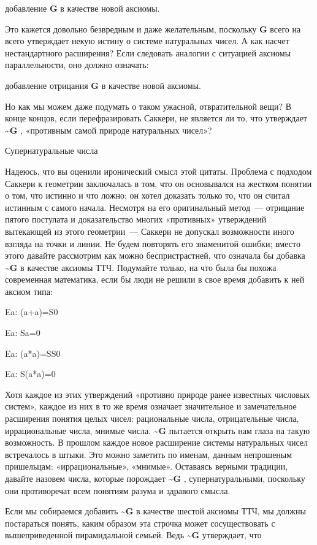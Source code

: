 \documentclass[../main.tex]{subfiles}
\begin{document}
добавление \textbf{G} в качестве новой аксиомы.

Это кажется довольно безвредным и даже желательным, поскольку \textbf{G} всего на всего утверждает некую истину о системе натуральных чисел. А как насчет нестандартного расширения? Если следовать аналогии с ситуацией аксиомы параллельности, оно должно означать:

добавление отрицания \textbf{G} в качестве новой аксиомы.

Но как мы можем даже подумать о таком ужасной, отвратительной вещи? В конце концов, если перефразировать Саккери, не является ли то, что утверждает \textbf{\textasciitilde G} , «противным самой природе натуральных чисел»?

Супернатуральные числа

Надеюсь, что вы оценили иронический смысл этой цитаты. Проблема с подходом Саккери к геометрии заключалась в том, что он основывался на жестком понятии о том, что истинно и что ложно; он хотел доказать только то, что он считал истинным с самого начала. Несмотря на его оригинальный метод~--- отрицание пятого постулата и доказательство многих «противных» утверждений вытекающей из этого геометрии~--- Саккери не допускал возможности иного взгляда на точки и линии. Не будем повторять его знаменитой ошибки; вместо этого давайте рассмотрим как можно беспристрастней, что означала бы добавка \textbf{\textasciitilde G} в качестве аксиомы ТТЧ. Подумайте только, на что была бы похожа современная математика, если бы люди не решили в свое время добавить к ней аксиом типа:

Ea: (a+a)=S0

Ea: Sa=0

Ea: (a*a)=SS0

Ea: S(a*a)=0

Хотя каждое из этих утверждений «противно природе ранее известных числовых систем», каждое из них в то же время означает значительное и замечательное расширения понятия целых чисел: рациональные числа, отрицательные числа, иррациональные числа, мнимые числа. \textbf{\textasciitilde G} пытается открыть нам глаза на такую возможность. В прошлом каждое новое расширение системы натуральных чисел встречалось в штыки. Это можно заметить по именам, данным непрошеным пришельцам: «иррациональные», «мнимые». Оставаясь верными традиции, давайте назовем числа, которые порождает \textbf{\textasciitilde G} , супернатуральными, поскольку они противоречат всем понятиям разума и здравого смысла.

Если мы собираемся добавить \textbf{\textasciitilde G} в качестве шестой аксиомы ТТЧ, мы должны постараться понять, каким образом эта строчка может сосуществовать с вышеприведенной пирамидальной семьей. Ведь \textbf{\textasciitilde G} утверждает, что
\end{document}
